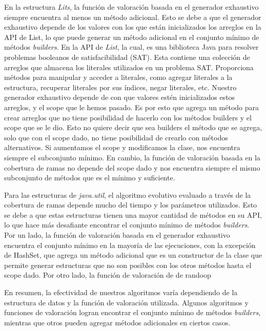 En la estructura \emph{Lits}, la función de valoración basada en el generador exhaustivo siempre encuentra al menos un método adicional. Esto se debe a que el generador exhaustivo depende de los valores con los que están inicializados los arreglos en la API de List, lo que puede generar un método adicional en el conjunto mínimo de métodos \emph{builders}. 
En la API de \emph{List}, la cual, es una biblioteca Java para resolver problemas booleanos de satisfacibilidad (SAT). Esta contiene una colección de arreglos que almacena los literales utilizados en un problema SAT. Proporciona métodos para manipular y acceder a literales, como agregar literales a la estructura, recuperar literales por sus índices, negar literales, etc. Nuestro generador exhaustivo depende de con que valores estén inicializados estos arreglos, y el scope que le hemos pasado. Es por esto que agrega un método para crear arreglos que no tiene posibilidad de hacerlo con los métodos builders y el scope que se le dio. Esto no quiere decir que sea builders el método que se agrega, solo que con el scope dado, no tiene posibilidad de crearlo con métodos alternativos. Si aumentamos el scope y modificamos la clase, nos encuentra siempre el subconjunto mínimo.
En cambio, la función de valoración basada en la cobertura de ramas no depende del scope dado y nos encuentra siempre el mismo subconjunto de métodos que es el mínimo y suficiente.

Para las estructuras de \emph{java.util}, el algoritmo evolutivo evaluado a través de la cobertura de ramas depende mucho del tiempo y los parámetros utilizados. Esto se debe a que estas estructuras tienen una mayor cantidad de métodos en su API, lo que hace más desafiante encontrar el conjunto mínimo de métodos \emph{builders}. Por un lado, la función de valoración basada en el generador exhaustivo encuentra el conjunto mínimo en la mayoría de las ejecuciones, con la excepción de HashSet, que agrega un método adicional que es un constructor de la clase que permite generar estructuras que no son posibles con los otros métodos hasta el scope dado.
Por otro lado, la función de valoración de de randoop 


En resumen, la efectividad de nuestros algoritmos varía dependiendo de la estructura de datos y la función de valoración utilizada. Algunos algoritmos y funciones de valoración logran encontrar el conjunto mínimo de métodos \emph{builders}, mientras que otros pueden agregar métodos adicionales en ciertos casos.


